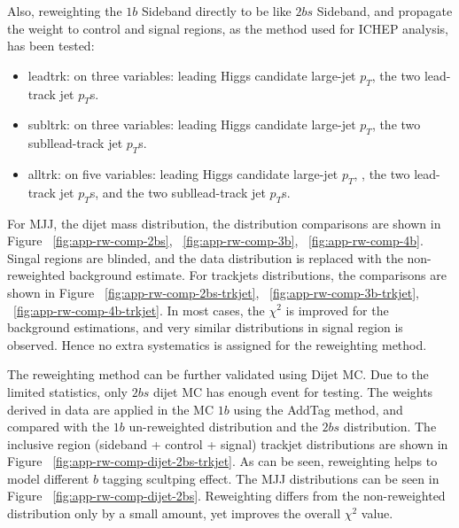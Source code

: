 Also, reweighting the $1b$ Sideband directly to be like $2bs$ Sideband, and propagate the weight to control and signal regions, as the method used for ICHEP analysis, has been tested:
\begin{itemize}
	\item leadtrk: on three variables: leading Higgs candidate large-\R jet $p_{T}$, the two lead-track jet $p_{T}$s.
	\item subltrk: on three variables: leading Higgs candidate large-\R jet $p_{T}$, the two subllead-track jet $p_{T}$s.
	\item alltrk: on five variables: leading Higgs candidate large-\R jet $p_{T}$, , the two lead-track jet $p_{T}$s, and the two subllead-track jet $p_{T}$s.
\end{itemize}

For MJJ, the dijet mass distribution, the distribution comparisons are shown in Figure ~\ref{fig:app-rw-comp-2bs}, ~\ref{fig:app-rw-comp-3b}, ~\ref{fig:app-rw-comp-4b}. Singal regions are blinded, and the data distribution is replaced with the non-reweighted background estimate. For trackjets \pt distributions, the comparisons are shown in Figure ~\ref{fig:app-rw-comp-2bs-trkjet}, ~\ref{fig:app-rw-comp-3b-trkjet}, ~\ref{fig:app-rw-comp-4b-trkjet}. In most cases, the $\chi^2$ is improved for the background estimations, and very similar distributions in signal region is observed. Hence no extra systematics is assigned for the reweighting method.

The reweighting method can be further validated using Dijet MC. Due to the limited statistics, only $2bs$ dijet MC has enough event for testing. The weights derived in data are applied in the MC $1b$ using the AddTag method, and compared with the $1b$ un-reweighted distribution and the $2bs$ distribution. The inclusive region (sideband + control + signal) trackjet \pt distributions are shown in Figure ~\ref{fig:app-rw-comp-dijet-2bs-trkjet}. As can be seen, reweighting helps to model different $b$ tagging scultping effect. The MJJ distributions can be seen in Figure ~\ref{fig:app-rw-comp-dijet-2bs}. Reweighting differs from the non-reweighted distribution only by a small amount, yet improves the overall $\chi^2$ value.

